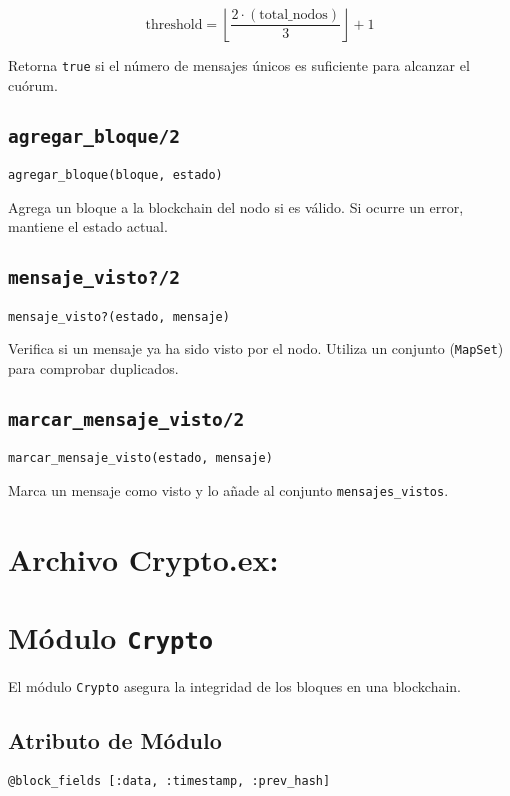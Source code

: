 {\[
\text{threshold} = \left\lfloor \frac{2 \cdot (\text{total\_nodos})}{3} \right\rfloor + 1
\]

Retorna \texttt{true} si el número de mensajes únicos es suficiente para alcanzar el cuórum.

\subsection*{\texttt{agregar\_bloque/2}}
\begin{verbatim}
agregar_bloque(bloque, estado)
\end{verbatim}

Agrega un bloque a la blockchain del nodo si es válido. Si ocurre un error, mantiene el estado actual.

\subsection*{\texttt{mensaje\_visto?/2}}
\begin{verbatim}
mensaje_visto?(estado, mensaje)
\end{verbatim}

Verifica si un mensaje ya ha sido visto por el nodo. Utiliza un conjunto (\texttt{MapSet}) para comprobar duplicados.

\subsection*{\texttt{marcar\_mensaje\_visto/2}}
\begin{verbatim}
marcar_mensaje_visto(estado, mensaje)
\end{verbatim}

Marca un mensaje como visto y lo añade al conjunto \texttt{mensajes\_vistos}.

\section*{Archivo \textbf{Crypto.ex}:}
\section*{Módulo \texttt{Crypto}}

El módulo \texttt{Crypto} asegura la integridad de los bloques en una blockchain.

\subsection*{Atributo de Módulo}
\begin{verbatim}
@block_fields [:data, :timestamp, :prev_hash]
\end{verbatim}

}
